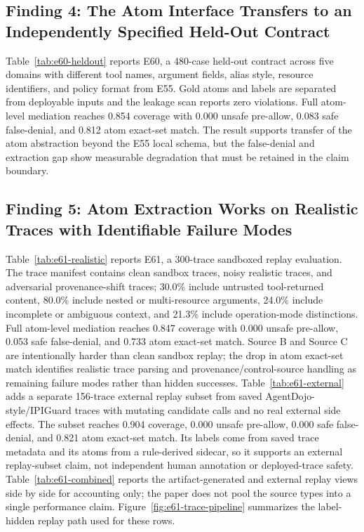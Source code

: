 \subsection{Finding 4: The Atom Interface Transfers to an Independently Specified Held-Out Contract}



Table~\ref{tab:e60-heldout} reports E60, a 480-case held-out contract across five domains with different tool names, argument fields, alias style, resource identifiers, and policy format from E55. Gold atoms and labels are separated from deployable inputs and the leakage scan reports zero violations. Full atom-level mediation reaches 0.854 coverage with 0.000 unsafe pre-allow, 0.083 safe false-denial, and 0.812 atom exact-set match. The result supports transfer of the atom abstraction beyond the E55 local schema, but the false-denial and extraction gap show measurable degradation that must be retained in the claim boundary.

\subsection{Finding 5: Atom Extraction Works on Realistic Traces with Identifiable Failure Modes}






Table~\ref{tab:e61-realistic} reports E61, a 300-trace sandboxed replay evaluation. The trace manifest contains clean sandbox traces, noisy realistic traces, and adversarial provenance-shift traces; 30.0\% include untrusted tool-returned content, 80.0\% include nested or multi-resource arguments, 24.0\% include incomplete or ambiguous context, and 21.3\% include operation-mode distinctions. Full atom-level mediation reaches 0.847 coverage with 0.000 unsafe pre-allow, 0.053 safe false-denial, and 0.733 atom exact-set match. Source B and Source C are intentionally harder than clean sandbox replay; the drop in atom exact-set match identifies realistic trace parsing and provenance/control-source handling as remaining failure modes rather than hidden successes.
Table~\ref{tab:e61-external} adds a separate 156-trace external replay subset from saved AgentDojo-style/IPIGuard traces with mutating candidate calls and no real external side effects. The subset reaches 0.904 coverage, 0.000 unsafe pre-allow, 0.000 safe false-denial, and 0.821 atom exact-set match. Its labels come from saved trace metadata and its atoms from a rule-derived sidecar, so it supports an external replay-subset claim, not independent human annotation or deployed-trace safety.
Table~\ref{tab:e61-combined} reports the artifact-generated and external replay views side by side for accounting only; the paper does not pool the source types into a single performance claim.
Figure~\ref{fig:e61-trace-pipeline} summarizes the label-hidden replay path used for these rows.

